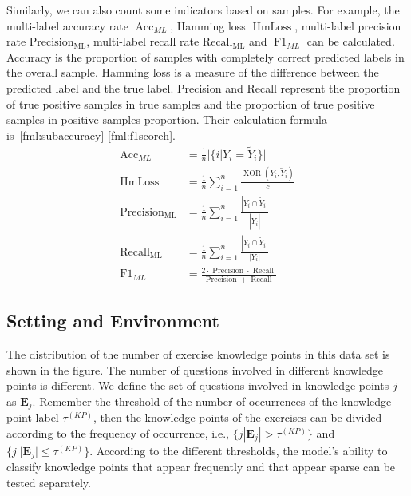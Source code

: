 Similarly, we can also count some indicators based on samples. For example, the multi-label accuracy rate \(\operatorname{Acc}_{ML}\), Hamming loss \(\operatorname{HmLoss}\), multi-label precision rate \(\operatorname{Precision_{ML}}\), multi-label recall rate \(\operatorname{Recall_{ML}}\) and \(\operatorname{F1}_{ML}\) can be calculated. Accuracy is the proportion of samples with completely correct predicted labels in the overall sample. Hamming loss is a measure of the difference between the predicted label and the true label. Precision and Recall represent the proportion of true positive samples in true samples and the proportion of true positive samples in positive samples proportion. Their calculation formula is~\ref{fml:subaccuracy}-\ref{fml:f1scoreh}.
\begin{align}
	\operatorname{Acc}_{ML}       & =\frac{1}{n} |\{i|Y_i=\tilde{Y}_i\}| \label{fml:subaccuracy}                                                                              \\
	\operatorname{HmLoss}         & =\frac{1}{n} \sum_{i=1}^{n} \frac{\operatorname{XOR}(Y_i,\tilde{Y}_i)}{c} \label{fml:hmloss}                                              \\
	\operatorname{Precision_{ML}} & =\frac{1}{n} \sum_{i=1}^{n} \frac{|Y_{i} \cap \tilde{Y}_i|}{|\tilde{Y}_i|} \label{fml:Precisionh}                                         \\
	\operatorname{Recall_{ML}}    & =\frac{1}{n} \sum_{i=1}^{n} \frac{|Y_{i} \cap \tilde{Y}_i|}{|Y_{i}|}    \label{fml:Recallh}                                               \\
	\operatorname{F1}_{ML}        & =\frac{2 \cdot \operatorname{Precision} \cdot \operatorname{Recall}}{\operatorname{Precision}+\operatorname{Recall}} \label{fml:f1scoreh}
\end{align}

\subsection{Setting and Environment}
The distribution of the number of exercise knowledge points in this data set is shown in the figure. The number of questions involved in different knowledge points is different. We define the set of questions involved in knowledge points \(j\) as \(\mathbf{E}_j\). Remember the threshold of the number of occurrences of the knowledge point label \(\tau^{(KP)} \), then the knowledge points of the exercises can be divided according to the frequency of occurrence, i.e., \( \{j|\mathbf{E}_j|>\tau^{(KP)}\} \) and \( \{j||\mathbf{E}_j|\leq\tau^{(KP)} \} \). According to the different thresholds, the model's ability to classify knowledge points that appear frequently and that appear sparse can be tested separately.

